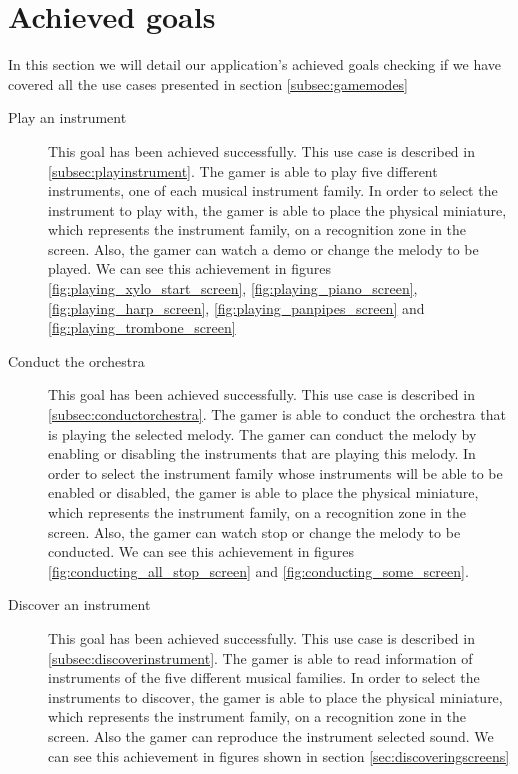 \section{Achieved goals}

In this section we will detail our application's achieved goals checking if we have covered all the use cases presented in section \ref{subsec:gamemodes} 

\begin{description}
\item[Play an instrument]
This goal has been achieved successfully. This use case is described in \ref{subsec:playinstrument}. The gamer is able to play five different instruments, one of each musical instrument family. In order to select the instrument to play with, the gamer is able to place the physical miniature, which represents the instrument family, on a recognition zone in the screen. Also, the gamer can watch a demo or change the melody to be played. We can see this achievement in figures \ref{fig:playing_xylo_start_screen}, \ref{fig:playing_piano_screen}, \ref{fig:playing_harp_screen}, \ref{fig:playing_panpipes_screen} and \ref{fig:playing_trombone_screen}

\item[Conduct the orchestra]
This goal has been achieved successfully. This use case is described in \ref{subsec:conductorchestra}. The gamer is able to conduct the orchestra that is playing the selected melody. The gamer can conduct the melody by enabling or disabling the instruments that are playing this melody. In order to select the instrument family whose instruments will be able to be enabled or disabled, the gamer is able to place the physical miniature, which represents the instrument family, on a recognition zone in the screen. Also, the gamer can watch stop or change the melody to be conducted. We can see this achievement in figures \ref{fig:conducting_all_stop_screen} and \ref{fig:conducting_some_screen}.

\item[Discover an instrument]
This goal has been achieved successfully. This use case is described in \ref{subsec:discoverinstrument}. The gamer is able to read information of instruments of the five different musical families. In order to select the instruments to discover, the gamer is able to place the physical miniature, which represents the instrument family, on a recognition zone in the screen. Also the gamer can reproduce the instrument selected sound. We can see this achievement in figures shown in section \ref{sec:discoveringscreens}


\end{description}
